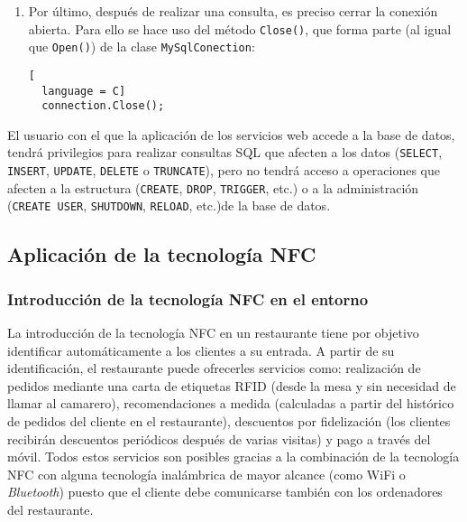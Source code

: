 \begin{enumerate}
\begin{itemize}
\begin{lstlisting}[
  language = C]
  MySqlDataReader resultado = comando.ExecuteReader();
\end{lstlisting}

\item Por otro lado, si la consulta no va a devolver ningún resultado, es
decir, si la consulta es del tipo: \texttt{INSERT}, \texttt{UPDATE},
\texttt{DELETE}, \texttt{TRUNCATE}, etc.; se utilizará el método
\texttt{ExecuteNonQuery()}:

\begin{lstlisting}[
  language = C]
  comando.ExecuteNonQuery();
\end{lstlisting}

La consulta tendrá efecto en la base de datos pero no devolverá ningún
resultado.
\end{itemize}

\item Por último, después de realizar una consulta, es preciso cerrar la
conexión abierta. Para ello se hace uso del método \texttt{Close()}, que forma
parte (al igual que \texttt{Open()}) de la clase \texttt{MySqlConection}:

\begin{lstlisting}[
  language = C]
  connection.Close();
\end{lstlisting}
\end{enumerate}

El usuario con el que la aplicación de los servicios web accede a la base
de datos, tendrá privilegios para realizar consultas \acs{SQL} que afecten
a los datos (\texttt{SELECT}, \texttt{INSERT}, \texttt{UPDATE},
\texttt{DELETE} o \texttt{TRUNCATE}), pero no tendrá acceso a operaciones
que afecten a la estructura  (\texttt{CREATE}, \texttt{DROP}, \texttt{TRIGGER},
etc.) o a la administración (\texttt{CREATE USER}, \texttt{SHUTDOWN},
\texttt{RELOAD}, etc.)de la base de datos.

  \subsection{Aplicación de la tecnología \acs{NFC}}
    \subsubsection{Introducción de la tecnología \acs{NFC} en el entorno}
  La introducción de la tecnología \acs{NFC} en un restaurante tiene por
  objetivo identificar automáticamente a los clientes a su entrada. A partir de
  su identificación, el restaurante puede ofrecerles servicios como:
  realización de pedidos mediante una carta de etiquetas \acs{RFID} (desde la
  mesa y sin necesidad de llamar al camarero), recomendaciones a medida
  (calculadas a partir del histórico de pedidos del cliente en el restaurante),
  descuentos por fidelización (los clientes recibirán descuentos periódicos
  después   de varias visitas) y pago a través del móvil. Todos estos servicios
  son posibles gracias a la combinación de la tecnología \acs{NFC} con alguna
  tecnología inalámbrica de mayor alcance (como \acs{WiFi} o \emph{Bluetooth})
  puesto que el cliente debe comunicarse también con los ordenadores del
  restaurante.
  
